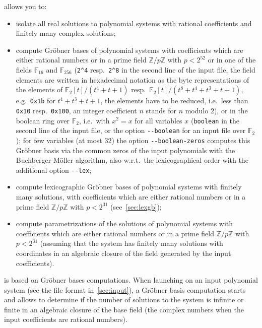 \documentclass[a4paper,english,11pt]{scrartcl}
\theoremstyle{definition}
\theoremstyle{remark}
\begin{document}
\msolve allows you to:
\begin{itemize}
\item isolate all real solutions to polynomial systems with rational
  coefficients and finitely many complex solutions;
\item compute Gr\"obner bases of polynomial systems with coefficients which are
  either rational numbers or in a prime field $\mathbb{Z}/p\mathbb{Z}$ with $p <
  2^{52}$ or in one of the fields $\mathbb{F}_{16}$ and $\mathbb{F}_{256}$
  (\verb+2^4+ resp.\ \verb+2^8+ in the second line of the input file, the
  field elements are written in hexadecimal notation as the byte
  representations of the elements of $\mathbb{F}_2[t]/(t^4+t+1)$ resp.\
  $\mathbb{F}_2[t]/(t^8+t^4+t^3+t+1)$, e.g.\ \verb+0x1b+ for $t^4+t^3+t+1$,
  the elements have to be reduced, i.e.\ less than \verb+0x10+ resp.\
  \verb+0x100+, an integer coefficient $n$ stands for $n$ modulo $2$), or in the boolean
  ring over $\mathbb{F}_2$, i.e.\ with $x^2 = x$ for all variables $x$
  (\verb+boolean+ in the second line of the input file, or the option
  \verb+--boolean+ for an input file over $\mathbb{F}_2$); for few variables
  (at most $32$) the option \verb+--boolean-zeros+ computes this Gr\"obner
  basis via the common zeros of the input polynomials with the
  Buchberger-M\"oller algorithm, also w.r.t.\ the lexicographical order
  with the additional option \verb+--lex+;
\item compute lexicographic Gr\"obner bases of polynomial systems with
  finitely many solutions, with coefficients which are either rational numbers
  or in a prime field $\mathbb{Z}/p\mathbb{Z}$ with $p < 2^{31}$
  (see~\cref{sec:lexgb});
\item compute parametrizations of the solutions of polynomial systems with
  coefficients which are either rational numbers or in a prime field
  $\mathbb{Z}/p\mathbb{Z}$ with $p < 2^{31}$ (assuming that the system has
  finitely many solutions with coordinates in an algebraic closure of the field
  generated by the input coefficients).
\end{itemize}

\msolve is based on Gr\"obner bases computations. When launching \msolve on
an input polynomial system (see the file format in~\cref{sec:input}), a Gr\"obner
basis computation starts and allows \msolve to determine if the number of solutions
to the system is infinite or finite in an algebraic closure of the base field
(the complex numbers when the input coefficients are rational numbers).
\end{document}
